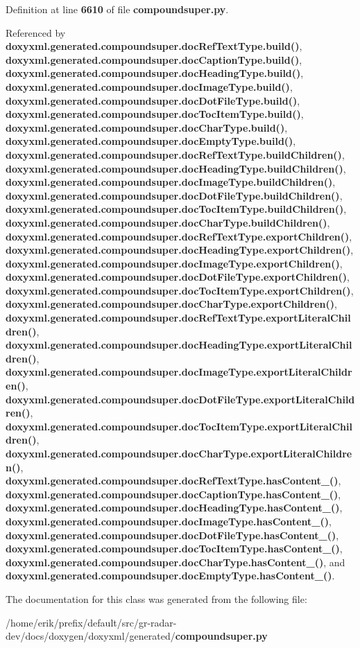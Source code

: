 Definition at line {\bf 6610} of file {\bf compoundsuper.\+py}.



Referenced by {\bf doxyxml.\+generated.\+compoundsuper.\+doc\+Ref\+Text\+Type.\+build()}, {\bf doxyxml.\+generated.\+compoundsuper.\+doc\+Caption\+Type.\+build()}, {\bf doxyxml.\+generated.\+compoundsuper.\+doc\+Heading\+Type.\+build()}, {\bf doxyxml.\+generated.\+compoundsuper.\+doc\+Image\+Type.\+build()}, {\bf doxyxml.\+generated.\+compoundsuper.\+doc\+Dot\+File\+Type.\+build()}, {\bf doxyxml.\+generated.\+compoundsuper.\+doc\+Toc\+Item\+Type.\+build()}, {\bf doxyxml.\+generated.\+compoundsuper.\+doc\+Char\+Type.\+build()}, {\bf doxyxml.\+generated.\+compoundsuper.\+doc\+Empty\+Type.\+build()}, {\bf doxyxml.\+generated.\+compoundsuper.\+doc\+Ref\+Text\+Type.\+build\+Children()}, {\bf doxyxml.\+generated.\+compoundsuper.\+doc\+Heading\+Type.\+build\+Children()}, {\bf doxyxml.\+generated.\+compoundsuper.\+doc\+Image\+Type.\+build\+Children()}, {\bf doxyxml.\+generated.\+compoundsuper.\+doc\+Dot\+File\+Type.\+build\+Children()}, {\bf doxyxml.\+generated.\+compoundsuper.\+doc\+Toc\+Item\+Type.\+build\+Children()}, {\bf doxyxml.\+generated.\+compoundsuper.\+doc\+Char\+Type.\+build\+Children()}, {\bf doxyxml.\+generated.\+compoundsuper.\+doc\+Ref\+Text\+Type.\+export\+Children()}, {\bf doxyxml.\+generated.\+compoundsuper.\+doc\+Heading\+Type.\+export\+Children()}, {\bf doxyxml.\+generated.\+compoundsuper.\+doc\+Image\+Type.\+export\+Children()}, {\bf doxyxml.\+generated.\+compoundsuper.\+doc\+Dot\+File\+Type.\+export\+Children()}, {\bf doxyxml.\+generated.\+compoundsuper.\+doc\+Toc\+Item\+Type.\+export\+Children()}, {\bf doxyxml.\+generated.\+compoundsuper.\+doc\+Char\+Type.\+export\+Children()}, {\bf doxyxml.\+generated.\+compoundsuper.\+doc\+Ref\+Text\+Type.\+export\+Literal\+Children()}, {\bf doxyxml.\+generated.\+compoundsuper.\+doc\+Heading\+Type.\+export\+Literal\+Children()}, {\bf doxyxml.\+generated.\+compoundsuper.\+doc\+Image\+Type.\+export\+Literal\+Children()}, {\bf doxyxml.\+generated.\+compoundsuper.\+doc\+Dot\+File\+Type.\+export\+Literal\+Children()}, {\bf doxyxml.\+generated.\+compoundsuper.\+doc\+Toc\+Item\+Type.\+export\+Literal\+Children()}, {\bf doxyxml.\+generated.\+compoundsuper.\+doc\+Char\+Type.\+export\+Literal\+Children()}, {\bf doxyxml.\+generated.\+compoundsuper.\+doc\+Ref\+Text\+Type.\+has\+Content\+\_\+()}, {\bf doxyxml.\+generated.\+compoundsuper.\+doc\+Caption\+Type.\+has\+Content\+\_\+()}, {\bf doxyxml.\+generated.\+compoundsuper.\+doc\+Heading\+Type.\+has\+Content\+\_\+()}, {\bf doxyxml.\+generated.\+compoundsuper.\+doc\+Image\+Type.\+has\+Content\+\_\+()}, {\bf doxyxml.\+generated.\+compoundsuper.\+doc\+Dot\+File\+Type.\+has\+Content\+\_\+()}, {\bf doxyxml.\+generated.\+compoundsuper.\+doc\+Toc\+Item\+Type.\+has\+Content\+\_\+()}, {\bf doxyxml.\+generated.\+compoundsuper.\+doc\+Char\+Type.\+has\+Content\+\_\+()}, and {\bf doxyxml.\+generated.\+compoundsuper.\+doc\+Empty\+Type.\+has\+Content\+\_\+()}.



The documentation for this class was generated from the following file\+:\begin{DoxyCompactItemize}
\item 
/home/erik/prefix/default/src/gr-\/radar-\/dev/docs/doxygen/doxyxml/generated/{\bf compoundsuper.\+py}\end{DoxyCompactItemize}
